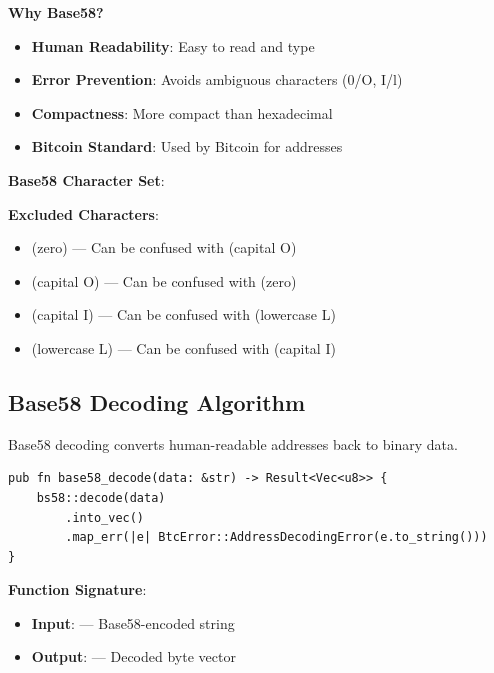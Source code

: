 \textbf{Why Base58?}
\begin{itemize}
  \item \textbf{Human Readability}: Easy to read and type
  \item \textbf{Error Prevention}: Avoids ambiguous characters (0/O, I/l)
  \item \textbf{Compactness}: More compact than hexadecimal
  \item \textbf{Bitcoin Standard}: Used by Bitcoin for addresses
\end{itemize}

\textbf{Base58 Character Set}:


\needspace{2in}
\noindent
\textbf{Excluded Characters}:
\begin{itemize}
  \item {} (zero) --- Can be confused with  (capital O)
  \item {} (capital O) --- Can be confused with  (zero)
  \item {} (capital I) --- Can be confused with  (lowercase L)
  \item {} (lowercase L) --- Can be confused with  (capital I)
\end{itemize}

\subsection{Base58 Decoding Algorithm}
\label{sec:ch08-base58-decoding}

Base58 decoding converts human-readable addresses back to binary data.

\begin{listing}[htbp]
\caption{Base58 decoding ()}
\label{lst:ch08-base58-decode}
\begin{verbatim}
pub fn base58_decode(data: &str) -> Result<Vec<u8>> {
    bs58::decode(data)
        .into_vec()
        .map_err(|e| BtcError::AddressDecodingError(e.to_string()))
}
\end{verbatim}
\end{listing}

\textbf{Function Signature}:
\begin{itemize}
  \item \textbf{Input}:  --- Base58-encoded string
  \item \textbf{Output}:  --- Decoded byte vector
\end{itemize}


